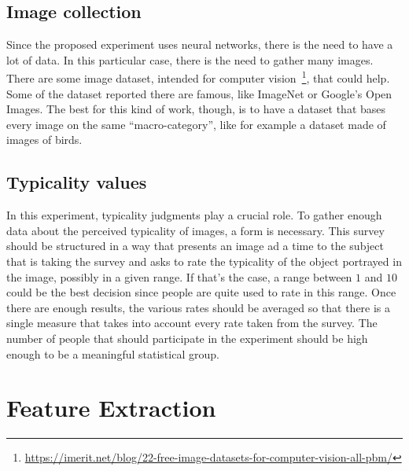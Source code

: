\documentclass[conference]{IEEEtran}
\begin{document}
		\subsection{Image collection}
			
			Since the proposed experiment uses neural networks, there is the need to have a lot of data. In this particular case, there is the need to gather many images. There are some image dataset, intended for computer 
			vision~\footnote{\url{https://imerit.net/blog/22-free-image-datasets-for-computer-vision-all-pbm/}}, that could help. Some of the dataset reported there are famous, like ImageNet or Google's Open Images. The 
			best for this kind of work, though, is to have a dataset that bases every image on the same ``macro-category'', like for example a dataset made of images of birds.
		
		\subsection{Typicality values}
			
			In this experiment, typicality judgments play a crucial role. To gather enough data about the perceived typicality of images, a form is necessary. This survey should be structured in a way that presents an 
			image ad a time to the subject that is taking the survey and asks to rate the typicality of the object portrayed in the image, possibly in a given range. If that's the case, a range between $1$ and $10$ 
			could be the best decision since people are quite used to rate in this range. Once there are enough results, the various rates should be averaged so that there is a single measure that takes into 
			account every rate taken from the survey. The number of people that should participate in the experiment should be high enough to be a meaningful statistical group.

	\section{Feature Extraction\label{sec:fe}}
\end{document}
